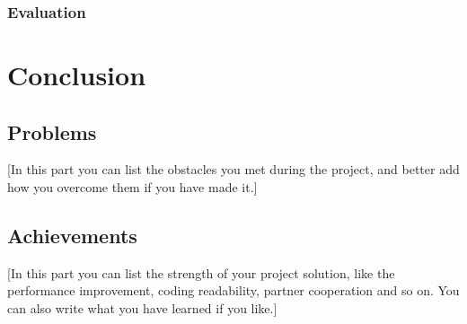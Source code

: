 \documentclass{article}
\begin{document}
\subsubsection{Evaluation}

\section{Conclusion}

\subsection{Problems}

[In this part you can list the obstacles you met during the project, and better add how you overcome them if you have made it.]

\subsection{Achievements}

[In this part you can list the strength of your project solution, like the performance improvement, coding readability, partner cooperation and so on. You can also write what you have learned if you like.]



\end{document}
